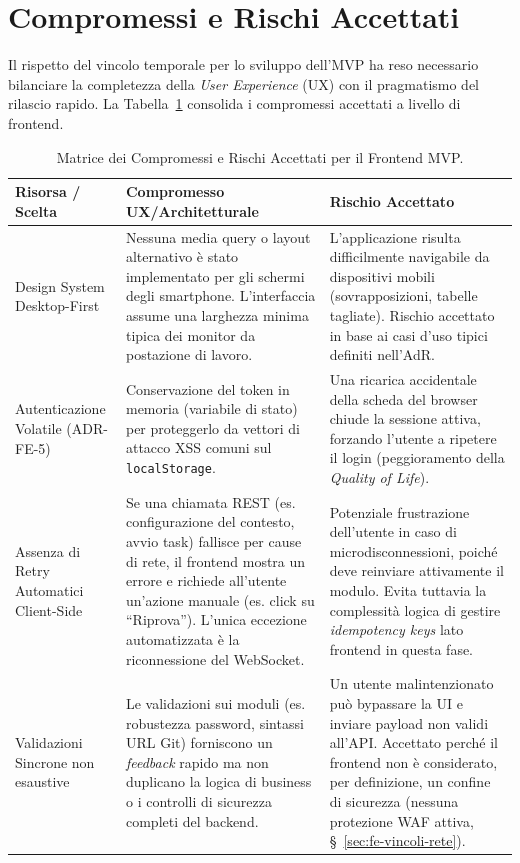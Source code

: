 \documentclass[11pt,a4paper]{article}
\begin{document}
\section{Compromessi e Rischi Accettati}
\label{sec:fe-compromessi}

Il rispetto del vincolo temporale per lo sviluppo dell'MVP ha reso necessario bilanciare la completezza della \emph{User Experience} (UX) con il pragmatismo del rilascio rapido. La Tabella~\ref{tab:fe-compromessi} consolida i compromessi accettati a livello di frontend.

\begin{table}[H]
\centering
\caption{Matrice dei Compromessi e Rischi Accettati per il Frontend MVP.}
\label{tab:fe-compromessi}
\vspace{2mm}
\renewcommand{\arraystretch}{1.2}
\begin{tabularx}{\textwidth}{|X|X|X|}
\hline
\textbf{Risorsa / Scelta} & \textbf{Compromesso UX/Architetturale} & \textbf{Rischio Accettato} \\ \hline
Design System Desktop-First & Nessuna media query o layout alternativo è stato implementato per gli schermi degli smartphone. L'interfaccia assume una larghezza minima tipica dei monitor da postazione di lavoro. & L'applicazione risulta difficilmente navigabile da dispositivi mobili (sovrapposizioni, tabelle tagliate). Rischio accettato in base ai casi d'uso tipici definiti nell'AdR. \\ \hline
Autenticazione Volatile (ADR-FE-5) & Conservazione del token in memoria (variabile di stato) per proteggerlo da vettori di attacco XSS comuni sul \texttt{localStorage}. & Una ricarica accidentale della scheda del browser chiude la sessione attiva, forzando l'utente a ripetere il login (peggioramento della \emph{Quality of Life}). \\ \hline
Assenza di Retry Automatici Client-Side & Se una chiamata REST (es. configurazione del contesto, avvio task) fallisce per cause di rete, il frontend mostra un errore e richiede all'utente un'azione manuale (es. click su ``Riprova''). L'unica eccezione automatizzata è la riconnessione del WebSocket. & Potenziale frustrazione dell'utente in caso di microdisconnessioni, poiché deve reinviare attivamente il modulo. Evita tuttavia la complessità logica di gestire \emph{idempotency keys} lato frontend in questa fase. \\ \hline
Validazioni Sincrone non esaustive & Le validazioni sui moduli (es. robustezza password, sintassi URL Git) forniscono un \emph{feedback} rapido ma non duplicano la logica di business o i controlli di sicurezza completi del backend. & Un utente malintenzionato può bypassare la UI e inviare payload non validi all'API. Accettato perché il frontend non è considerato, per definizione, un confine di sicurezza (nessuna protezione WAF attiva, \S~\ref{sec:fe-vincoli-rete}). \\ \hline

\end{tabularx}
\end{table}
\end{document}
